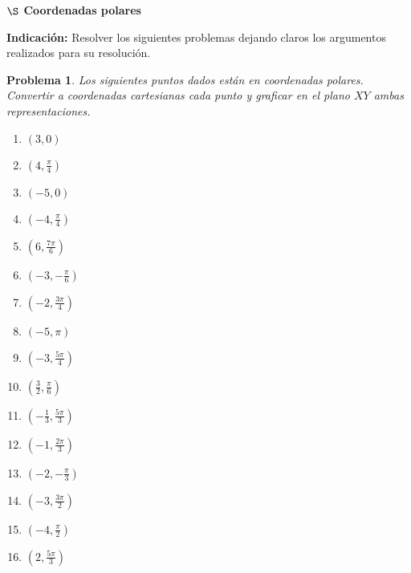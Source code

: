 \documentclass[letterpaper,12pt]{article}
\newtheorem{prob}{Problema}
\begin{document}
\begin{center}
\Large \textbf{$\S$ Coordenadas polares}
\end{center}
\textbf{Indicación:} Resolver los siguientes problemas dejando claros los argumentos realizados para su resolución.

\begin{prob}
Los siguientes puntos dados están en coordenadas polares. Convertir a coordenadas cartesianas cada punto y graficar en el plano $XY$ ambas representaciones.
\begin{multicols}{3}
\begin{enumerate}[label=\alph*)]
    \item $(3,0)$
    \item $\displaystyle \left(4,\frac{\pi}{4}\right)$
    \item $(-5,0)$
    \item $\displaystyle \left(-4,\frac{\pi}{4}\right)$
    \item $\displaystyle \left(6,\frac{7\pi}{6}\right)$
    \item $\displaystyle \left(-3,-\frac{\pi}{6}\right)$
    \item $\displaystyle \left(-2,\frac{3\pi}{4}\right)$
    \item $(-5,\pi)$
    \item $\displaystyle \left(-3,\frac{5\pi}{4}\right)$
    \item $\displaystyle \left(\frac{3}{2},\frac{\pi}{6}\right)$
    \item $\displaystyle \left(-\frac{1}{3},\frac{5\pi}{3}\right)$
    \item $\displaystyle \left(-1,\frac{2\pi}{3}\right)$
    \item $\displaystyle \left(-2,-\frac{\pi}{3}\right)$
    \item $\displaystyle \left(-3,\frac{3\pi}{2}\right)$
    \item $\displaystyle \left(-4, \frac{\pi}{2}\right)$
    \item $\displaystyle \left(2,\frac{5\pi}{3}\right)$
\end{enumerate}
\end{multicols}
\end{prob}
\end{document}

